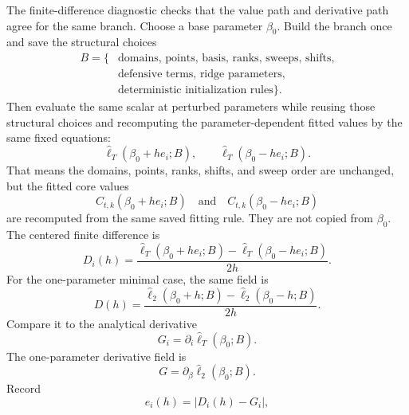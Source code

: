 \documentclass[11pt]{article}
\numberwithin{equation}{section}
\newcommand{\widehatell}{\widehat\ell}
\begin{document}
The finite-difference diagnostic checks that the value path and derivative path agree
for the same branch.  Choose a base parameter \(\beta_0\).  Build the branch
once and save the structural choices
\begin{equation}
    \begin{aligned}
    B=\{&
    \text{domains, points, basis, ranks, sweeps, shifts,}\\
    &\text{defensive terms, ridge parameters,}\\
    &\text{deterministic initialization rules}\}.
    \end{aligned}
    \label{eq:p24-p19-94}
\end{equation}
Then evaluate the same scalar at perturbed parameters while reusing those
structural choices and recomputing the parameter-dependent fitted values by the
same fixed equations:
\begin{equation}
    \widehatell_T(\beta_0+h e_i;B),
    \qquad
    \widehatell_T(\beta_0-h e_i;B).
    \label{eq:p24-p19-95}
\end{equation}
That means the domains, points, ranks, shifts, and sweep order are unchanged,
but the fitted core values
\begin{equation}
    C_{t,k}(\beta_0+h e_i;B)
    \quad\text{and}\quad
    C_{t,k}(\beta_0-h e_i;B)
    \label{eq:p24-p19-95a}
\end{equation}
are recomputed from the same saved fitting rule.  They are not copied from
\(\beta_0\).
The centered finite difference is
\begin{equation}
    D_i(h)
    =
    \frac{
    \widehatell_T(\beta_0+h e_i;B)
    -
    \widehatell_T(\beta_0-h e_i;B)}
    {2h}.
    \label{eq:p24-p19-96}
\end{equation}
For the one-parameter minimal case, the same field is
\begin{equation}
    D(h)
    =
    \frac{
    \widehatell_2(\beta_0+h;B)
    -
    \widehatell_2(\beta_0-h;B)}
    {2h}.
    \label{eq:p24-p22-fd0a}
\end{equation}
Compare it to the analytical derivative
\begin{equation}
    G_i=\partial_i\widehatell_T(\beta_0;B).
    \label{eq:p24-p19-97}
\end{equation}
The one-parameter derivative field is
\begin{equation}
    G=\partial_\beta\widehatell_2(\beta_0;B).
    \label{eq:p24-p22-fd0b}
\end{equation}
Record
\begin{equation}
    e_i(h)=|D_i(h)-G_i|,
    \label{eq:p24-p19-98}
\end{equation}
\end{document}
